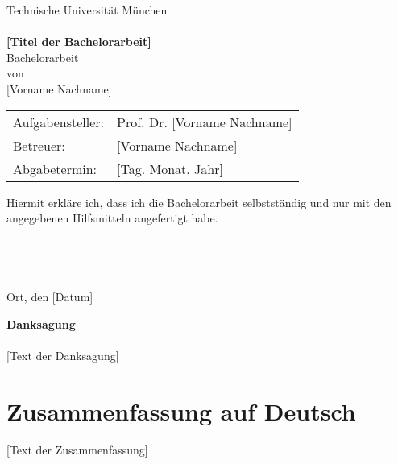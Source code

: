 \documentclass[german,a4paper,12pt,oneside]{scrbook}
\theoremstyle{definition}
\theoremstyle{definition}
\theoremstyle{definition}
\theoremstyle{definition}
\theoremstyle{definition}
\theoremstyle{definition}
\begin{document}
\pagestyle{empty}       %
  \parbox{1.5cm}{}\hspace{310pt}%
  \parbox{1.5cm}{}%
\vspace*{1.5cm}
\begin{center}
{\Huge Technische Universit\"at M\"unchen} 
\\
\vspace*{1.5cm}
{\huge {}} 
\\
\vspace*{3cm}
{\Huge {\bf [Titel der Bachelorarbeit]}}
\\
\vspace*{3cm}
{\Large Bachelorarbeit}\linebreak \\ 
{\Large von}\linebreak \\
{\Large [Vorname Nachname]}\\
\vspace*{3cm}
{\Large 
\begin{tabular}{ll}
Aufgabensteller: & Prof. Dr. [Vorname Nachname]\\
Betreuer: & [Vorname Nachname]\\
Abgabetermin: & [Tag. Monat. Jahr]
\end{tabular}
}
\end{center}
\newpage    %

\vspace*{18cm}
\noindent
Hiermit erkl\"are ich, dass ich die Bachelorarbeit selbstst\"andig und nur mit den angegebenen Hilfsmitteln angefertigt habe.
\\
\\
\\
\\
\\
Ort, den [Datum]
\newpage

\vspace*{2.2cm}
\noindent %
{\Huge {\bf Danksagung}} \\
\vspace*{1.6cm} \\
\pagestyle{headings}
[Text der Danksagung]

\newpage
\section*{Zusammenfassung auf Deutsch}
[Text der Zusammenfassung]
\end{document}
